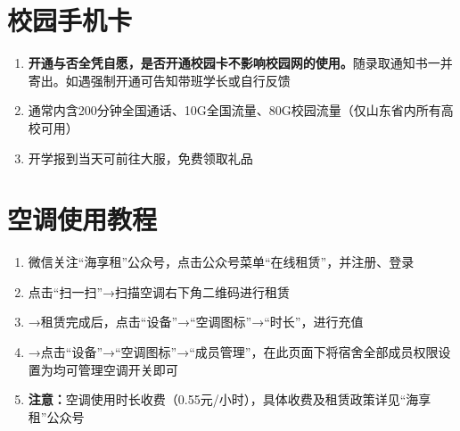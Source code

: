 \section[校园手机卡]{校园手机卡}
\begin{enumerate}
    \item \textbf{开通与否全凭自愿，是否开通校园卡不影响校园网的使用。}随录取通知书一并寄出。如遇强制开通可告知带班学长或自行反馈
    \item 通常内含200分钟全国通话、10G全国流量、80G校园流量（仅山东省内所有高校可用）\footnotemark
    \item 开学报到当天可前往大服，免费领取礼品
\end{enumerate}

\section[空调使用教程]{空调使用教程}
\label{air_control}
\begin{enumerate}
    \item 微信关注“海享租”公众号，点击公众号菜单“在线租赁”，并注册、登录
    \item 点击“扫一扫”→扫描空调右下角二维码进行租赁\footnotemark
    \item →租赁完成后，点击“设备”→“空调图标”→“时长”，进行充值
    \item →点击“设备”→“空调图标”→“成员管理”，在此页面下将宿舍全部成员权限设置为均可管理空调开关即可
    \item \textbf{注意：}空调使用时长收费（0.55元/小时），具体收费及租赁政策详见“海享租”公众号
\end{enumerate}

